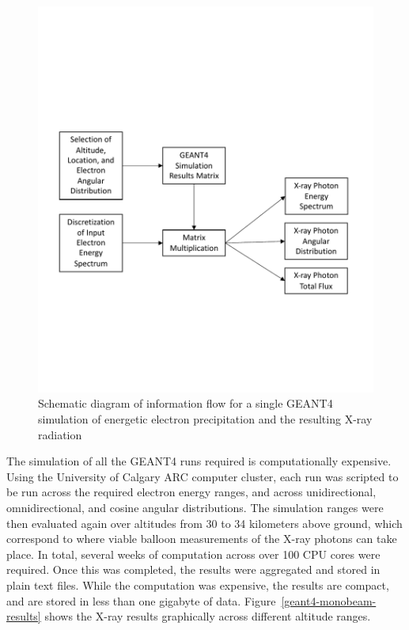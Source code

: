 \begin{figure}[p]
\label{geant4_how_to_use}
\includegraphics[width=1.0\textwidth]{figures/chapter_3/geant4_how_to_use/geant4_how_to_use}
\caption{Schematic diagram of information flow for a single GEANT4 simulation of energetic electron precipitation and the resulting X-ray radiation}
\end{figure}

The simulation of all the GEANT4 runs required is computationally expensive. Using the University of Calgary ARC computer cluster, each run was scripted to be run across the required electron energy ranges, and across unidirectional, omnidirectional, and cosine angular distributions. The simulation ranges were then evaluated again over altitudes from 30 to 34 kilometers above ground, which correspond to where viable balloon measurements of the X-ray photons can take place. In total, several weeks of computation across over 100 CPU cores were required. Once this was completed, the results were aggregated and stored in plain text files. While the computation was expensive, the results are compact, and are stored in less than one gigabyte of data. Figure~\ref{geant4-monobeam-results} shows the X-ray results graphically across different altitude ranges.

